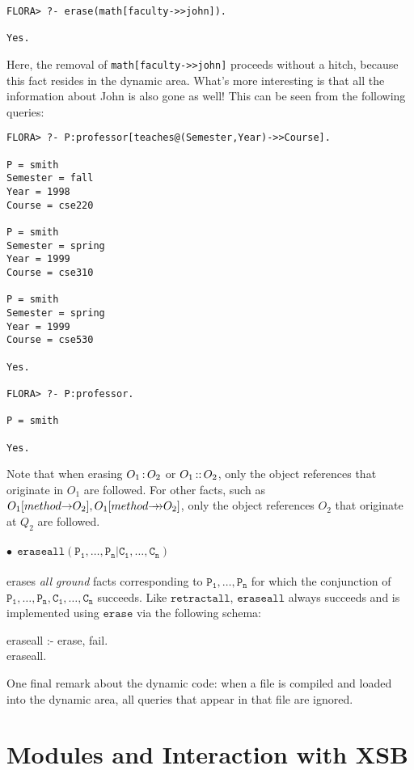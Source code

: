 \documentclass[11pt]{report}
\begin{document}
\begin{verbatim}
FLORA> ?- erase(math[faculty->>john]).

Yes.
\end{verbatim}
Here, the removal of {\tt math[faculty->>john]} proceeds without a hitch,
because this fact resides in the dynamic area. What's more interesting is
that all the information about John is also gone as well!
This can be seen from the following queries:
\begin{verbatim}
FLORA> ?- P:professor[teaches@(Semester,Year)->>Course].

P = smith
Semester = fall
Year = 1998
Course = cse220

P = smith
Semester = spring
Year = 1999
Course = cse310

P = smith
Semester = spring
Year = 1999
Course = cse530

Yes.

FLORA> ?- P:professor.

P = smith

Yes.
\end{verbatim}
Note that when erasing $O_1{\,{\bf{:}}\,}O_2$ or $O_1{\,{\bf{::}}\,}O_2$, only the object
references that originate in $O_1$ are followed. For other \fl facts, such as
$O_1[method{{\rightarrow}}O_2],O_1[method{{\rightarrow\!\!\!\!\rightarrow}}O_2]$, only the object references
$O_2$ that originate at $Q_2$ are followed.

\paragraph{$\bullet~~\mathtt{eraseall(P_1,\ldots,P_n | C_1,\ldots,C_n)}$} erases \emph{all ground}
facts corresponding to $\mathtt{P_1,\ldots,P_n}$ for which the conjunction
of $\mathtt{P_1,\ldots,P_n,C_1,\ldots,C_n}$ succeeds. Like
$\mathtt{retractall}$, $\mathtt{eraseall}$ always succeeds and is
implemented using $\mathtt{erase}$ via the following schema:
\begin{qrules}
eraseall :- erase, fail. \\
eraseall.
\end{qrules}

One final remark about the dynamic code: when a file is compiled and loaded
into the dynamic area, all queries that appear in that file are ignored.

\section{\FLORA Modules and Interaction with XSB}\label{sec-module}
\end{document}
